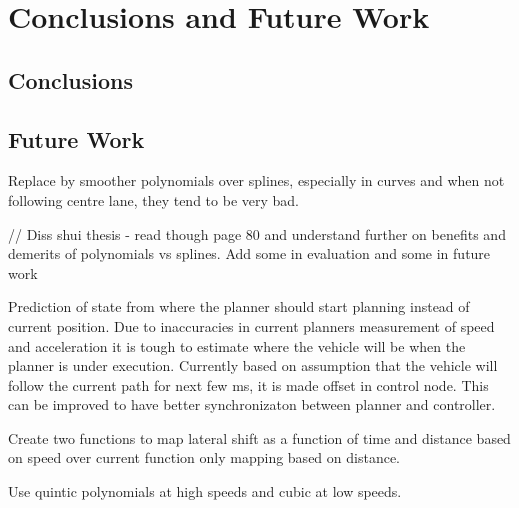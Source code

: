 \chapter{Conclusions and Future Work}
\label{conclusion}
\section{Conclusions}

\section{Future Work}
Replace by smoother polynomials over splines, especially in curves and when not following centre lane, they tend to be very bad. 

// Diss shui thesis - read though page 80 and understand further on benefits and demerits of polynomials vs splines. Add some in evaluation and some in future work


Prediction of state from where the planner should start planning instead of current position. 
Due to inaccuracies in current planners measurement of speed and acceleration it is tough to estimate where the vehicle will be when the planner is under execution. Currently based on assumption that the vehicle will follow the current path for next few ms, it is made offset in control node. This can be improved to have better synchronizaton between planner and controller. 


Create two functions to map lateral shift as a function of time and distance based on speed over current function only mapping based on distance.  

Use quintic polynomials at high speeds and cubic at low speeds. 

